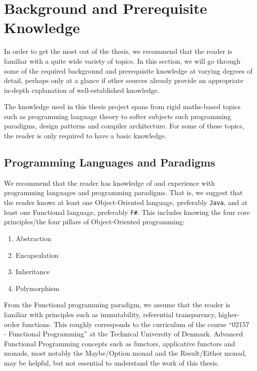 \chapter{Background and Prerequisite Knowledge} \label{sec:background}

In order to get the most out of the thesis, we recommend that the reader is familiar with a quite wide variety of topics.
In this section, we will go through some of the required background and prerequisite knowledge at varying degrees of detail, perhaps only at a glance if 
other sources already provide an appropriate in-depth explanation of well-established knowledge.

The knowledge used in this thesis project spans from rigid maths-based topics such as programming language theory to softer subjects such 
programming paradigms, design patterns and compiler architecture. For some of these topics, the reader is only required to have a basic knowledge. 

\section{Programming Languages and Paradigms}

We recommend that the reader has knowledge of and experience with programming languages and programming paradigms.
That is, we suggest that the reader knows at least one Object-Oriented language, preferably \texttt{Java}, and at least one Functional language,
preferably \texttt{F\#}. This includes knowing the four core principles/the four pillars of Object-Oriented programming\cite{clean_architecture}:

\begin{enumerate}
\item Abstraction
\item Encapsulation
\item Inheritance
\item Polymorphism
\end{enumerate}

From the Functional programming paradigm, we assume that the reader is familiar with principles such as immutability, referential transparency,
higher-order functions. This roughly corresponds to the curriculum of the course ``02157 - Functional Programming''\cite{curriculum_02157} at the Technical University of 
Denmark. Advanced Functional Programming concepts such as functors, applicative functors and monads, most notably the Maybe/Option monad and
the Result/Either monad, may be helpful, but not essential to understand the work of this thesis. 

